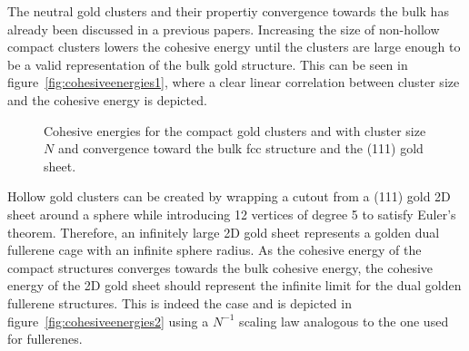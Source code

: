 The neutral gold clusters and their propertiy convergence towards the bulk has
already been discussed in a previous
papers.\autocite{Assadollahzadeh_systematicsearchminimum_2009} Increasing the
size of non-hollow compact clusters lowers the cohesive energy until the
clusters are large enough to be a valid representation of the bulk gold
structure. This can be seen in figure~\ref{fig:cohesiveenergies1}, where a
clear linear correlation between cluster size and the cohesive energy is
depicted.
%
\begin{figure}[htb]\centering
    \hfill
	\caption{Cohesive energies for \protect{} the compact gold clusters and \protect{} with cluster size $N$ and \protect{} convergence toward the bulk \acs{fcc} structure and \protect{} the (111) gold sheet.}
\end{figure}
%
Hollow gold clusters can be created by wrapping a cutout from a (111) gold 2D
sheet around a sphere while introducing 12 vertices of degree 5 to satisfy
Euler's theorem. Therefore, an infinitely large 2D gold sheet represents a
golden dual fullerene cage with an infinite sphere radius. As the cohesive
energy of the compact structures converges towards the bulk cohesive energy, the
cohesive energy of the 2D gold sheet should represent the infinite limit for the
dual golden fullerene structures. This is indeed the case and is depicted in
figure~\ref{fig:cohesiveenergies2} using a $N^{-1}$ scaling law analogous to the
one used for fullerenes.\autocite{Wirz_smallfullerenesgraphene_2015}

